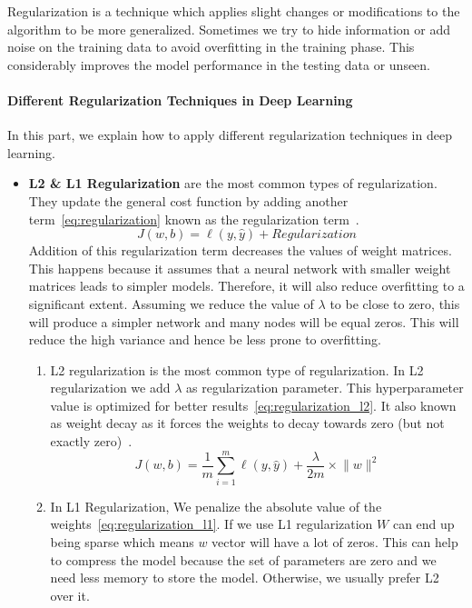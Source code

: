 Regularization is a technique which applies slight changes or modifications to the algorithm to be more generalized. Sometimes we try to hide information or add noise on the training data to avoid overfitting in the training phase. This considerably improves the model performance in the testing data or unseen.

\paragraph{Different Regularization Techniques in Deep Learning}

In this part, we explain how to apply different regularization techniques in deep learning.

\begin{itemize}
\item \textbf{L2 \& L1 Regularization} are the most common types of regularization. They update the general cost function by adding another term~\eqref{eq:regularization} known as the regularization term~\cite{Web_Analyticsvidhya_Regularization}.
\begin{equation}\label{eq:regularization}
J(w,b) = \ell(y,\widehat{y}) + Regularization
\end{equation}
%
Addition of this regularization term decreases the values of weight matrices. This happens because it assumes that a neural network with smaller weight matrices leads to simpler models. Therefore, it will also reduce overfitting to a significant extent. Assuming we reduce the value of $\lambda$ to be close to zero, this will produce a simpler network and many nodes will be equal zeros. This will reduce the high variance  and hence be less prone to overfitting.%
\begin{enumerate}
\item L2 regularization is the most common type of regularization. In L2 regularization we add $\lambda$ as regularization parameter. This  hyperparameter value is optimized for better results~\eqref{eq:regularization_l2}. It also known as weight decay as it forces the weights to decay towards zero (but not exactly zero)~\cite{Web_Analyticsvidhya_Regularization}.%
\begin{equation}\label{eq:regularization_l2}
J(w,b) = \frac{1}{m} \sum_{i=1}^{m} \ell(y,\widehat{y})+\frac{\lambda}{2m} \times \lVert w \rVert^2
\end{equation}%
\item In L1 Regularization, We penalize the absolute value of the weights~\eqref{eq:regularization_l1}. If we use L1 regularization $W$ can end up being sparse which means $w$ vector will have a lot of zeros. This can help to compress the model because the set of parameters are zero and we need less memory to store the model. Otherwise, we usually prefer L2 over it.%

\end{enumerate}
\end{itemize}

